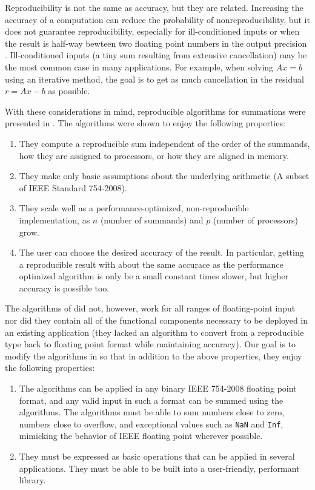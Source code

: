   Reproducibility is not the same as accuracy, but they are related. Increasing the accuracy of a computation can reduce the probability of nonreproducibility, but it does not guarantee reproducibility, especially for ill-conditioned inputs or when the result is half-way bewteen two floating point numbers in the output precision \cite{taufer}. Ill-conditioned inputs (a tiny sum resulting from extensive cancellation) may be the most common case in many applications. For example, when solving $Ax = b$ using an iterative method, the goal is to get as much cancellation in the residual $r = Ax - b$ as possible.

  With these considerations in mind, reproducible algorithms for summations were presented in \cite{repsum}. The algorithms were shown to enjoy the following properties:
  \begin{enumerate}
    \item They compute a reproducible sum independent of the order of the summands, how they are assigned to processors, or how they are aligned in memory.
    \item They make only basic assumptions about the underlying arithmetic (A subset of IEEE Standard 754-2008).
    \item They scale well as a performance-optimized, non-reproducible implementation, as $n$ (number of summands) and $p$ (number of processors) grow.
    \item The user can choose the desired accuracy of the result. In particular, getting a reproducible result with about the same accurace as the performance optimized algorithm is only be a small constant times slower, but higher accuracy is possible too.
  \end{enumerate}
  The algorithms of \cite{repsum} did not, however, work for all ranges of floating-point input nor did they contain all of the functional components necessary to be deployed in an existing application (they lacked an algorithm to convert from a reproducible type back to floating point format while maintaining accuracy). Our goal is to modify the algorithms in \cite{repsum} so that in addition to the above properties, they enjoy the following properties:
  \begin{enumerate}
    \item The algorithms can be applied in any binary IEEE 754-2008 floating point format, and any valid input in such a format can be summed using the algorithms. The algorithms must be able to sum numbers close to zero, numbers close to overflow, and exceptional values such as \texttt{NaN} and \texttt{Inf}, mimicking the behavior of IEEE floating point wherever possible.
    \item They must be expressed as basic operations that can be applied in several applications. They must be able to be built into a user-friendly, performant library.
  \end{enumerate}

